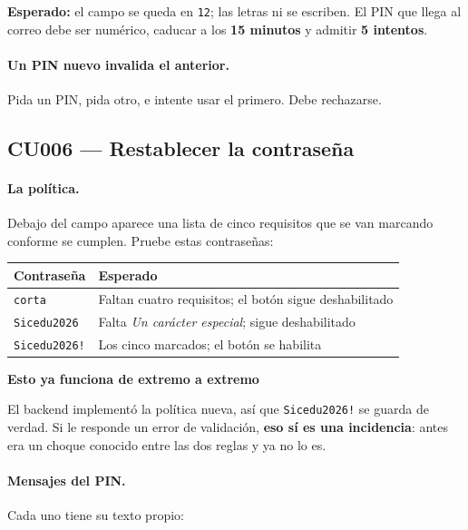\documentclass[11pt,a4paper]{article}
\newenvironment{aviso}[1]
  {\par\medskip\noindent
   \begin{lrbox}{\cajaaviso}
   \begin{minipage}{\dimexpr\textwidth-2\fboxsep-2\fboxrule\relax}
   \smallskip
   \textbf{\textcolor{ambar}{#1}}\par\smallskip}
  {\smallskip\end{minipage}\end{lrbox}%
   \fcolorbox{ambar}{grisclaro}{\usebox{\cajaaviso}}\par\medskip}
\begin{document}
\textbf{Esperado:} el campo se queda en \texttt{12}; las letras ni se escriben.
El PIN que llega al correo debe ser numérico, caducar a los \textbf{15 minutos}
y admitir \textbf{5 intentos}.

\paragraph{Un PIN nuevo invalida el anterior.} Pida un PIN, pida otro, e intente
usar el primero. Debe rechazarse.

\subsection{CU006 --- Restablecer la contraseña}

\paragraph{La política.} Debajo del campo aparece una lista de cinco requisitos
que se van marcando conforme se cumplen. Pruebe estas contraseñas:

\begin{center}
\begin{tabularx}{\textwidth}{lX}
\toprule
\textbf{Contraseña} & \textbf{Esperado} \\
\midrule
\texttt{corta} & Faltan cuatro requisitos; el botón sigue deshabilitado \\
\texttt{Sicedu2026} & Falta \emph{Un carácter especial}; sigue deshabilitado \\
\texttt{Sicedu2026!} & Los cinco marcados; el botón se habilita \\
\bottomrule
\end{tabularx}
\end{center}

\begin{aviso}{Esto ya funciona de extremo a extremo}
El backend implementó la política nueva, así que \texttt{Sicedu2026!} se guarda
de verdad. Si le responde un error de validación, \textbf{eso sí es una
incidencia}: antes era un choque conocido entre las dos reglas y ya no lo es.
\end{aviso}

\paragraph{Mensajes del PIN.} Cada uno tiene su texto propio:
\end{document}
